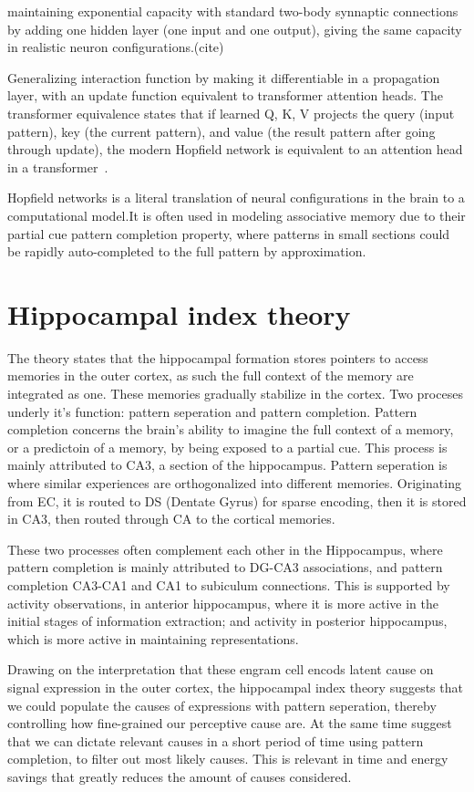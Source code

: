 \documentclass{surreydissertation}
\begin{document}
maintaining exponential capacity with standard two-body synnaptic connections by adding one hidden layer (one input and one output), giving the same capacity in realistic neuron configurations.(cite)

Generalizing interaction function by making it differentiable in a propagation layer, with an update function equivalent to transformer attention heads. The transformer equivalence states that if learned Q, K, V projects the query (input pattern), key (the current pattern), and value (the result pattern after going through update), the modern Hopfield network is equivalent to an attention head in a transformer~\cite{ramsauer2020}.

Hopfield networks is a literal translation of neural configurations in the brain to a computational model.It is often used in modeling associative memory due to their partial cue pattern completion property, where patterns in small sections could be rapidly auto-completed to the full pattern by approximation.


\section{Hippocampal index theory}
The theory states that the hippocampal formation stores pointers to access memories in the outer cortex, as such the full context of the memory are integrated as one. These memories gradually stabilize in the cortex. Two proceses underly it's function: pattern seperation and pattern completion. Pattern completion concerns the brain's ability to imagine the full context of a memory, or a predictoin of a memory, by being exposed to a partial cue. This process is mainly attributed to CA3, a section of the hippocampus.  Pattern seperation is where similar experiences are orthogonalized into different memories. Originating from EC,  it is routed to DS (Dentate Gyrus) for sparse encoding, then it is stored in CA3, then routed through CA to the cortical memories.

These two processes often complement each other in the Hippocampus, where pattern completion is mainly attributed to DG-CA3 associations, and pattern completion CA3-CA1 and CA1 to subiculum connections. This is supported by activity observations, in anterior hippocampus, where it is more active in the initial stages of information extraction; and activity in posterior hippocampus, which is more active in maintaining representations.

Drawing on the interpretation that these engram cell encods latent cause on signal expression in the outer cortex, the hippocampal index theory suggests that we could populate the causes of expressions with pattern seperation, thereby controlling how fine-grained our perceptive cause are. At the same time suggest that we can dictate relevant causes in a short period of time using pattern completion, to filter out most likely causes. This is relevant in time and energy savings that greatly reduces the amount of causes considered.
\end{document}
